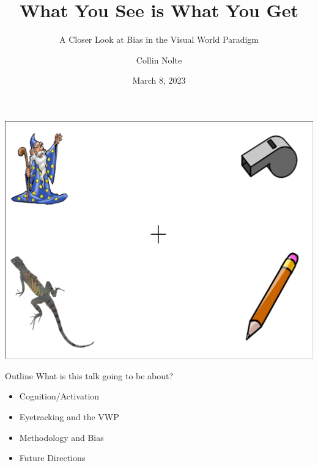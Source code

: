 \documentclass{beamer}
\title[Public Defense]{What You See is What You Get}
\subtitle{A Closer Look at Bias in the Visual World Paradigm}
\author{Collin Nolte}
\date{March 8, 2023}
\begin{document}
\begin{frame}
  \titlepage
\end{frame}


\begin{frame}
\begin{center}
\includegraphics[scale=0.35]{img/wizard_lizard_whistle_pencil.png}
\end{center}
\end{frame}

%

\begin{frame}{Outline}\large
What is this talk going to be about?

\begin{itemize}
	\item Cognition/Activation 
	\item Eyetracking and the VWP
	\item Methodology and Bias
	\item Future Directions
\end{itemize}

\end{frame}
\end{document}
